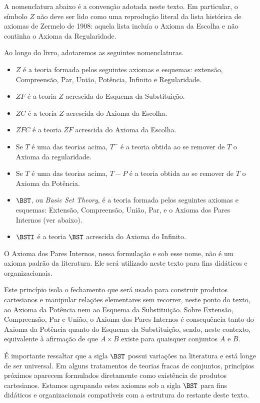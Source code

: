     A nomenclatura abaixo é a convenção adotada neste texto.
    Em particular, o símbolo $Z$ não deve ser lido como uma reprodução literal da lista histórica de axiomas de Zermelo de 1908: aquela lista incluía o Axioma da Escolha e não continha o Axioma da Regularidade.
\begin{metadefinition}
    Ao longo do livro, adotaremos as seguintes nomenclaturas.
    \label{mdef:nomesDasTeorias}
    \begin{itemize}
        \item $Z$ é a teoria formada pelos seguintes axiomas e esquemas: extensão, Compreensão, Par, União, Potência, Infinito e Regularidade.
        \item $ZF$ é a teoria $Z$ acrescida do Esquema da Substituição.
        \item $ZC$ é a teoria $Z$ acrescida do Axioma da Escolha.
        \item $ZFC$ é a teoria $ZF$ acrescida do Axioma da Escolha.
        \item Se $T$ é uma das teorias acima, $T^-$ é a teoria obtida ao se remover de $T$ o Axioma da regularidade.
        \item Se $T$ é uma das teorias acima, $T-P$ é a teoria obtida ao se remover de $T$ o Axioma da Potência.
        \item $\BST$, ou \emph{Basic Set Theory}, é a teoria formada pelos seguintes axiomas e esquemas: Extensão, Compreensão, União, Par, e o Axioma dos Pares Internos (ver abaixo).
        \item $\BSTI$ é a teoria $\BST$ acrescida do Axioma do Infinito.
    \end{itemize}

    O Axioma dos Pares Internos, nessa formulação e sob esse nome, não é um axioma padrão da literatura.
    Ele será utilizado neste texto para fins didáticos e organizacionais.

    Este princípio isola o fechamento que será usado para construir produtos cartesianos e manipular relações elementares sem recorrer, neste ponto do texto, ao Axioma da Potência nem ao Esquema da Substituição.
    Sobre Extensão, Compreensão, Par e União, o Axioma dos Pares Internos é consequência tanto do Axioma da Potência quanto do Esquema da Substituição, sendo, neste contexto, equivalente à afirmação de que $A \times B$ existe para quaisquer conjuntos $A$ e $B$.

    É importante ressaltar que a sigla $\BST$ possui variações na literatura e está longe de ser universal.
    Em alguns tratamentos de teorias fracas de conjuntos, princípios próximos aparecem formulados diretamente como existência de produtos cartesianos.
    Estamos agrupando estes axiomas sob a sigla $\BST$ para fins didáticos e organizacionais compatíveis com a estrutura do restante deste texto.
\end{metadefinition}

